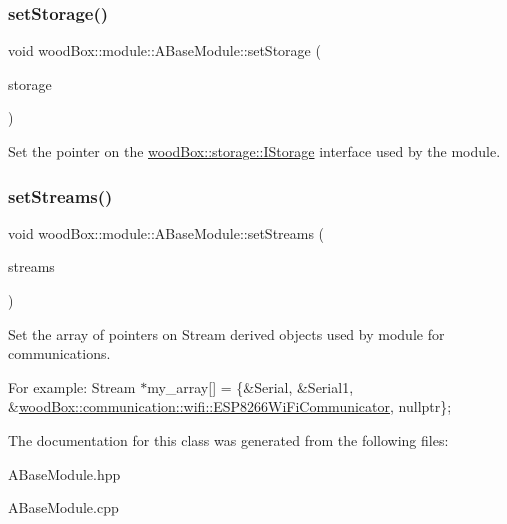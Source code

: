 \subsubsection{\texorpdfstring{set\+Storage()}{setStorage()}}
{\footnotesize\ttfamily void wood\+Box\+::module\+::\+A\+Base\+Module\+::set\+Storage (\begin{DoxyParamCaption}\item[{\mbox{\hyperlink{classwood_box_1_1storage_1_1_i_storage}{storage\+::\+I\+Storage}} $\ast$}]{storage }\end{DoxyParamCaption})}

Set the pointer on the \mbox{\hyperlink{classwood_box_1_1storage_1_1_i_storage}{wood\+Box\+::storage\+::\+I\+Storage}} interface used by the module. \mbox{\label{classwood_box_1_1module_1_1_a_base_module_a6e3b73bd36f668f5d621dee3070c131a}} 
\subsubsection{\texorpdfstring{set\+Streams()}{setStreams()}}
{\footnotesize\ttfamily void wood\+Box\+::module\+::\+A\+Base\+Module\+::set\+Streams (\begin{DoxyParamCaption}\item[{Stream $\ast$$\ast$}]{streams }\end{DoxyParamCaption})}

Set the array of pointers on Stream derived objects used by module for communications.

For example\+: {\ttfamily Stream $\ast$my\+\_\+array\mbox{[}\mbox{]} = \{\&Serial, \&Serial1, \&\mbox{\hyperlink{classwood_box_1_1communication_1_1wifi_1_1_e_s_p8266_wi_fi_communicator}{wood\+Box\+::communication\+::wifi\+::\+E\+S\+P8266\+Wi\+Fi\+Communicator}}, nullptr\};} 

The documentation for this class was generated from the following files\+:\begin{DoxyCompactItemize}
\item 
A\+Base\+Module.\+hpp\item 
A\+Base\+Module.\+cpp\end{DoxyCompactItemize}
